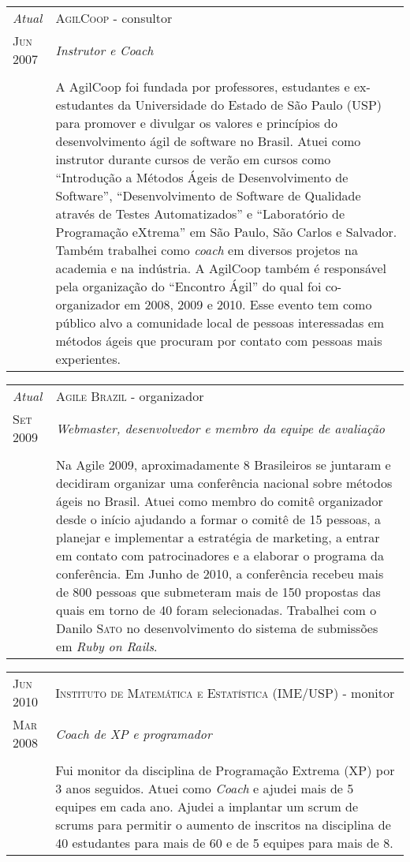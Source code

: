 \documentclass[letter,10pt]{article}
\begin{document}
\begin{tabular}{p{2.5cm}|p{13.5cm}}
  \emph{Atual} & \textsc{AgilCoop} - consultor\\
  \textsc{Jun 2007}& \emph{Instrutor e Coach}\\
  &\\
  &A AgilCoop foi fundada por professores, estudantes e ex-estudantes
  da Universidade do Estado de São Paulo (USP) para promover e
  divulgar os valores e princípios do desenvolvimento ágil de software
  no Brasil. Atuei como instrutor durante cursos de verão em cursos
  como ``Introdução a Métodos Ágeis de Desenvolvimento de Software'',
  ``Desenvolvimento de Software de Qualidade através de Testes
  Automatizados'' e ``Laboratório de Programação eXtrema'' em São
  Paulo, São Carlos e Salvador.
  Também trabalhei como \textit{coach} em diversos projetos na
  academia e na indústria. A AgilCoop também é responsável pela
  organização do ``Encontro Ágil'' do qual foi co-organizador em 2008,
  2009 e 2010. Esse evento tem como público alvo a comunidade local de
  pessoas interessadas em métodos ágeis que procuram por contato com
  pessoas mais experientes.
\end{tabular}

\begin{tabular}{p{2.5cm}|p{13.5cm}}
  \emph{Atual} & \textsc{Agile Brazil} - organizador\\
  \textsc{Set 2009}& \emph{Webmaster, desenvolvedor e membro da equipe
    de avaliação}\\
  &\\
  &Na Agile 2009, aproximadamente 8 Brasileiros se juntaram e
  decidiram organizar uma conferência nacional sobre métodos ágeis no
  Brasil. Atuei como membro do comitê organizador desde o início
  ajudando a formar o comitê de 15 pessoas, a planejar e implementar a
  estratégia de marketing, a entrar em contato com patrocinadores e a
  elaborar o programa da conferência.
 Em Junho de 2010, a conferência
  recebeu mais de 800 pessoas que submeteram mais de 150 propostas das
  quais em torno de 40 foram selecionadas. Trabalhei com o Danilo
  \textsc{Sato} no desenvolvimento do sistema de submissões em
  \textit{Ruby on Rails}.
\end{tabular}

\begin{tabular}{p{2.5cm}|p{13.5cm}}
  \textsc{Jun 2010} & \textsc{Instituto de Matemática e Estatística
    (IME/USP)} - monitor\\
  \textsc{Mar 2008}& \emph{Coach de XP e programador}\\
  &\\
  & Fui monitor da disciplina de Programação Extrema (XP) por 3 anos
  seguidos. Atuei como \textit{Coach} e ajudei mais de 5 equipes em
  cada ano. Ajudei a implantar um scrum de scrums para permitir o
  aumento de inscritos na disciplina de 40 estudantes para mais de 60
  e de 5 equipes para mais de 8.
\end{tabular}
\end{document}
